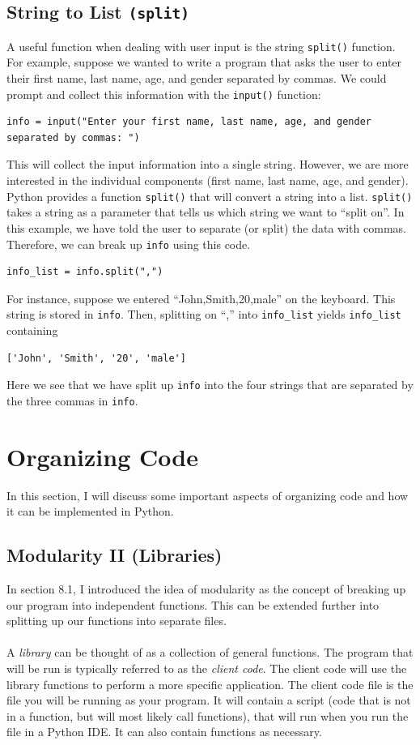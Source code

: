 \documentclass{article}
\begin{document}
\subsection{String to List \texttt{(split)}}
A useful function when dealing with user input is the string \texttt{split()} function. For example, suppose we wanted to write a program that asks the user to enter their first name, last name, age, and gender separated by commas. We could prompt and collect this information with the \texttt{input()} function:
\begin{verbatim}
info = input("Enter your first name, last name, age, and gender separated by commas: ")
\end{verbatim}
This will collect the input information into a single string. However, we are more interested in the individual components (first name, last name, age, and gender). Python provides a function \texttt{split()} that will convert a string into a list. \texttt{split()} takes a string as a parameter that tells us which string we want to ``split on''. In this example, we have told the user to separate (or split) the data with commas. Therefore, we can break up \texttt{info} using this code.
\begin{verbatim}
info_list = info.split(",")
\end{verbatim}
For instance, suppose we entered ``John,Smith,20,male'' on the keyboard. This string is stored in \texttt{info}. Then, splitting on ``,'' into \texttt{info\_list} yields \texttt{info\_list} containing
\begin{verbatim}
['John', 'Smith', '20', 'male']
\end{verbatim}
Here we see that we have split up \texttt{info} into the four strings that are separated by the three commas in \texttt{info}.

\newpage

\section{Organizing Code}
In this section, I will discuss some important aspects of organizing code and how it can be implemented in Python.

\subsection{Modularity II (Libraries)}
In section 8.1, I introduced the idea of modularity as the concept of breaking up our program into independent functions. This can be extended further into splitting up our functions into separate files.\\\\
A \textit{library} can be thought of as a collection of general functions. The program that will be run is typically referred to as the \textit{client code}. The client code will use the library functions to perform a more specific application. The client code file is the file you will be running as your program. It will contain a script (code that is not in a function, but will most likely call functions), that will run when you run the file in a Python IDE. It can also contain functions as necessary. 
\end{document}
